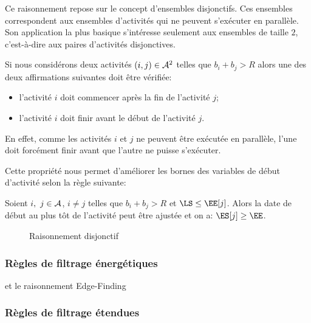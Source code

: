 Ce raisonnement repose sur le concept d'ensembles disjonctifs. Ces
ensembles correspondent aux ensembles d'activités qui ne peuvent
s'exécuter en parallèle. Son application la plus basique s'intéresse
seulement aux ensembles de taille $2$, c'est-à-dire aux paires
d'activités disjonctives. 

Si nous considérons deux activités $(i,j) \in {\cal A}^2$ telles que
$b_i+b_j > R$ alors une des deux affirmations suivantes doit être
vérifiée:
\begin{itemize}
\item l'activité $i$ doit commencer après la fin de l'activité $j$;
\item l'activité $i$ doit finir avant le début de l'activité $j$.
\end{itemize}
En effet, comme les activités $i$ et $j$ ne peuvent être exécutée en
parallèle, l'une doit forcément finir avant que l'autre ne puisse
s'exécuter.

Cette propriété nous permet d'améliorer les bornes des variables de
début d'activité selon la règle suivante:
\begin{reg}
  Soient $i,\ j \in {\cal A}$, $i\neq j$ telles que $b_i+b_j > R$ et $\LS
  \le \EE[j]$. Alors la date de début au plus tôt de l'activité peut
  être ajustée et on a: $ \ES[j] \ge \EE$. 
\end{reg}

\begin{ex}
  \begin{figure}[htb!]
    \centering
    \caption{Raisonnement disjonctif}
    \label{fig:disj_CUSP}
  \end{figure}
\end{ex}

\subsubsection{Règles de filtrage énergétiques}
 et le raisonnement
Edge-Finding~\cite{VilimEF}
\subsubsection{Règles de filtrage étendues}




